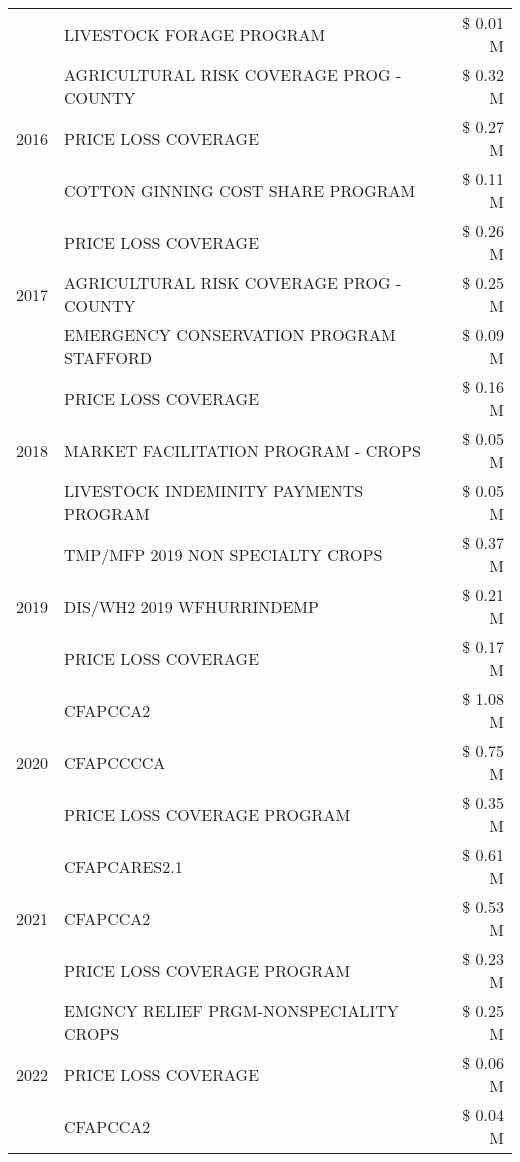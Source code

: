 \begin{tabular}{llr}
 & LIVESTOCK FORAGE PROGRAM & \$ 0.01 M \\
\cline{1-3}
\multirow[t]{3}{*}{2016} & AGRICULTURAL RISK COVERAGE PROG - COUNTY & \$ 0.32 M \\
 & PRICE LOSS COVERAGE & \$ 0.27 M \\
 & COTTON GINNING COST SHARE PROGRAM & \$ 0.11 M \\
\cline{1-3}
\multirow[t]{3}{*}{2017} & PRICE LOSS COVERAGE & \$ 0.26 M \\
 & AGRICULTURAL RISK COVERAGE PROG - COUNTY & \$ 0.25 M \\
 & EMERGENCY CONSERVATION PROGRAM STAFFORD & \$ 0.09 M \\
\cline{1-3}
\multirow[t]{3}{*}{2018} & PRICE LOSS COVERAGE & \$ 0.16 M \\
 & MARKET FACILITATION PROGRAM - CROPS & \$ 0.05 M \\
 & LIVESTOCK INDEMINITY PAYMENTS PROGRAM & \$ 0.05 M \\
\cline{1-3}
\multirow[t]{3}{*}{2019} & TMP/MFP 2019 NON SPECIALTY CROPS & \$ 0.37 M \\
 & DIS/WH2 2019 WFHURRINDEMP & \$ 0.21 M \\
 & PRICE LOSS COVERAGE & \$ 0.17 M \\
\cline{1-3}
\multirow[t]{3}{*}{2020} & CFAPCCA2 & \$ 1.08 M \\
 & CFAPCCCCA & \$ 0.75 M \\
 & PRICE LOSS COVERAGE PROGRAM & \$ 0.35 M \\
\cline{1-3}
\multirow[t]{3}{*}{2021} & CFAPCARES2.1 & \$ 0.61 M \\
 & CFAPCCA2 & \$ 0.53 M \\
 & PRICE LOSS COVERAGE PROGRAM & \$ 0.23 M \\
\cline{1-3}
\multirow[t]{3}{*}{2022} & EMGNCY RELIEF PRGM-NONSPECIALITY CROPS & \$ 0.25 M \\
 & PRICE LOSS COVERAGE & \$ 0.06 M \\
 & CFAPCCA2 & \$ 0.04 M \\
\cline{1-3}
\bottomrule
\end{tabular}
